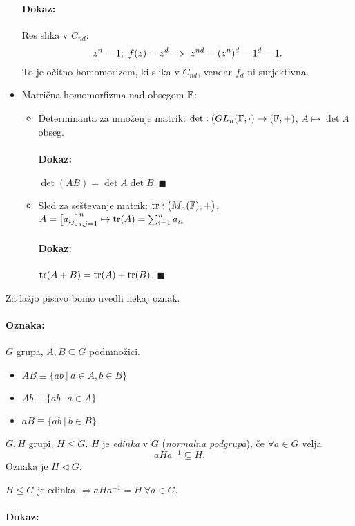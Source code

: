 \begin{itemize}
{		\paragraph{Dokaz:} Res slika v $C_{nd}$:
		\[
			z^n = 1;\ f(z) = z^d\ \Rightarrow\ z^{nd} = (z^n)^d = 1^d = 1.
		\] To je o\v citno homomorizem, ki slika v $C_{nd}$, vendar $f_d$ ni surjektivna.}
	\item{Matri\v cna homomorfizma nad obsegom $\mathbb{F}$:
		\begin{itemize}
			\item{Determinanta za mno\v zenje matrik: $\det: (GL_n (\mathbb{F}, \cdot) \to (\mathbb{F}, +)$, $A \mapsto \det A$ obseg.
				\paragraph{Dokaz:} $\det (AB) = \det A \det B.\ \blacksquare$}
			\item{Sled za se\v stevanje matrik: $\operatorname{tr} : \big(M_n(\mathbb{F}), +\big)$, $A = \big[a_{ij}\big]^n_{i,j = 1} \mapsto \operatorname{tr} (A) = \sum_{i=1}^n a_{ii}$
				\paragraph{Dokaz:} $\operatorname{tr}(A + B) = \operatorname{tr}(A) + \operatorname{tr}(B)$. $\blacksquare$}
		\end{itemize}}
\end{itemize}

\ni Za la\v zjo pisavo bomo uvedli nekaj oznak.

\paragraph{Oznaka:} $G$ grupa, $A,B \subseteq G$ podmno\v zici.
\begin{itemize}
	\item{$AB \equiv \{ab\ |\ a \in A, b \in B\}$}
	\item{$Ab \equiv \{ab\ |\ a \in A\}$}
	\item{$aB \equiv \{ab\ |\ b \in B\}$}
\end{itemize}

\begin{defin}
	$G, H$ grupi, $H \leq G$. $H$ je \emph{edinka} v $G$ (\emph{normalna podgrupa}), \v ce $\forall a \in G$ velja
	\[
		a H a^{-1} \subseteq H.
	\]
	Oznaka je $H \lhd G$.
\end{defin}

\begin{lema}
	$H \leq G$ je edinka $\iff a H a^{-1} = H\ \forall a \in G$.
\end{lema}

\paragraph{Dokaz:}

